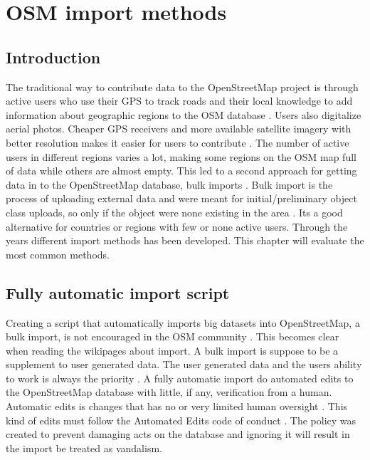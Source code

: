  \chapter{OSM import methods}

\section{Introduction}
The traditional way to contribute data to the OpenStreetMap project is through active users who use their GPS to track roads and their local knowledge to add information about geographic regions to the OSM database \cite{Zielstra2013}. Users also digitalize aerial photos. Cheaper GPS receivers and more available satellite imagery with better resolution makes it easier for users to contribute \cite{Chilton}. The number of active users in different regions varies a lot, making some regions on the OSM map full of data while others are almost empty. This led to a second approach for getting data in to the OpenStreetMap database, bulk imports \cite{Zielstra2013}.  Bulk import is the process of uploading external data and were meant for initial/preliminary object class uploads, so only if the object were none existing in the area  \cite{Zielstra2013}.  Its a good alternative for countries or regions with few or none active users. Through the years different import methods has been developed. This chapter will evaluate the most common methods. 

\section{Fully automatic import script}
Creating a script that automatically imports big datasets into OpenStreetMap, a bulk import, is not encouraged in the OSM community \cite{Zielstra2013}. This becomes clear when reading the wikipages about import. A bulk import is suppose to be a supplement to user generated data. The user generated data and the users ability to work is always the priority \cite{OSMimport}. A fully automatic import do automated edits to the OpenStreetMap database with little, if any, verification from a human. Automatic edits is changes that has no or very limited human oversight \cite{OSMAutiEdit}. This kind of edits must follow the Automated Edits code of conduct \cite{OSMAutomaticEdits}. The policy was created to prevent damaging acts on the database and ignoring it will result in the import be treated as vandalism. 

